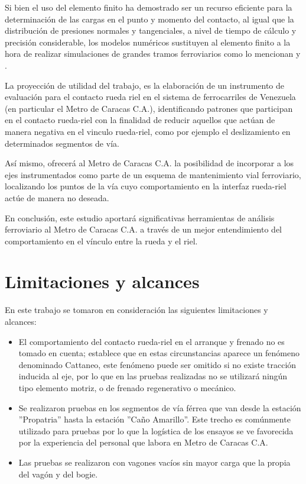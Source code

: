 \documentclass[main]{subfiles}
\begin{document}
	Si bien el uso del elemento finito ha demostrado ser un recurso eficiente para la determinación de las cargas en el punto y momento del contacto, al igual que la distribución de presiones normales y tangenciales, a nivel de tiempo de cálculo y precisión considerable, los modelos numéricos sustituyen al elemento finito a la hora de realizar simulaciones de grandes tramos ferroviarios como lo mencionan \citet{2011CompM..47..105V} y \citet{Kalker1991243}.

	La proyección de utilidad del trabajo, es la elaboración de un instrumento de evaluación para el contacto rueda riel en el sistema de ferrocarriles de Venezuela (en particular el Metro de Caracas C.A.), identificando patrones que participan en el contacto rueda-riel con la finalidad de reducir aquellos que actúan de manera negativa en el vinculo rueda-riel, como por ejemplo el deslizamiento en determinados segmentos de vía.
	
	Así mismo, ofrecerá al Metro de Caracas C.A. la posibilidad de incorporar a los ejes instrumentados como parte de un esquema de mantenimiento vial ferroviario, localizando los puntos de la vía cuyo comportamiento en la interfaz rueda-riel actúe de manera no deseada.
	
	En conclusión, este estudio aportará significativas herramientas de análisis ferroviario al Metro de Caracas C.A. a través de un mejor entendimiento del comportamiento en el vínculo entre la rueda y el riel.
	
\section{Limitaciones y alcances}
	En este trabajo se tomaron en consideración las siguientes limitaciones y alcances:
\begin{itemize}
	\item El comportamiento del contacto rueda-riel en el arranque y frenado no es tomado en cuenta; \citet{KalkerRF} establece que en estas circunstancias aparece un fenómeno denominado Cattaneo, este fenómeno puede ser omitido si no existe tracción inducida al eje, por lo que en las pruebas realizadas no se utilizará ningún tipo elemento motriz, o de frenado regenerativo o mecánico.
	
	\item Se realizaron pruebas en los segmentos de vía férrea que van desde la estación ''Propatria'' hasta la estación ''Caño Amarillo''. Este trecho es comúnmente utilizado para pruebas por lo que la logística de los ensayos se ve favorecida por la experiencia del personal que labora en Metro de Caracas C.A.
	
	\item Las pruebas se realizaron con vagones vacíos sin mayor carga que la propia del vagón y del bogie.
\end{itemize}
\end{document}
